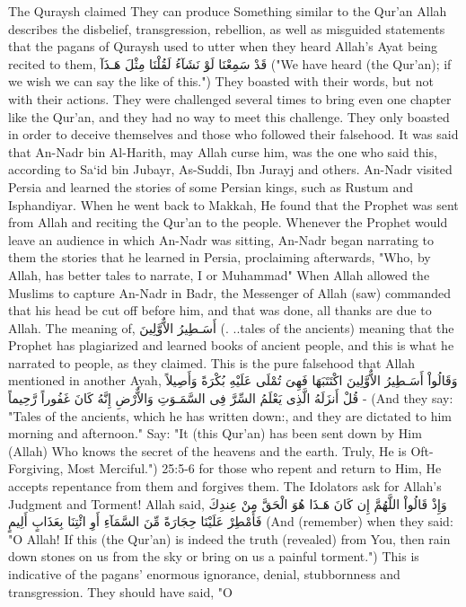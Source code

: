 \documentclass[11pt,a4paper,openany]{book}
\let\textAR\textarabic
\begin{document}
\begin{tafsirbox}
The Quraysh claimed They can produce Something similar to the Qur'an Allah describes the disbelief, transgression, rebellion, as well as misguided statements that the pagans of Quraysh used to utter when they heard Allah's Ayat being recited to them, \textAR{قَدْ} \textAR{سَمِعْنَا} \textAR{لَوْ} \textAR{نَشَآءُ} \textAR{لَقُلْنَا} \textAR{مِثْلَ} \textAR{هَـذَآ} ("We have heard (the Qur'an); if we wish we can say the like of this.") They boasted with their words, but not with their actions. They were challenged several times to bring even one chapter like the Qur'an, and they had no way to meet this challenge. They only boasted in order to deceive themselves and those who followed their falsehood. It was said that An-Nadr bin Al-Harith, may Allah curse him, was the one who said this, according to Sa`id bin Jubayr, As-Suddi, Ibn Jurayj and others. An-Nadr visited Persia and learned the stories of some Persian kings, such as Rustum and Isphandiyar. When he went back to Makkah, He found that the Prophet was sent from Allah and reciting the Qur'an to the people. Whenever the Prophet would leave an audience in which An-Nadr was sitting, An-Nadr began narrating to them the stories that he learned in Persia, proclaiming afterwards, "Who, by Allah, has better tales to narrate, I or Muhammad" When Allah allowed the Muslims to capture An-Nadr in Badr, the Messenger of Allah (saw) commanded that his head be cut off before him, and that was done, all thanks are due to Allah. The meaning of, \textAR{أَسَـطِيرُ} \textAR{الاٌّوَّلِينَ} (. ..tales of the ancients) meaning that the Prophet has plagiarized and learned books of ancient people, and this is what he narrated to people, as they claimed. This is the pure falsehood that Allah mentioned in another Ayah, \textAR{وَقَالُواْ} \textAR{أَسَـطِيرُ} \textAR{الاٌّوَّلِينَ} \textAR{اكْتَتَبَهَا} \textAR{فَهِىَ} \textAR{تُمْلَى} \textAR{عَلَيْهِ} \textAR{بُكْرَةً} \textAR{وَأَصِيلاً} - \textAR{قُلْ} \textAR{أَنزَلَهُ} \textAR{الَّذِى} \textAR{يَعْلَمُ} \textAR{السِّرَّ} \textAR{فِى} \textAR{السَّمَـوَتِ} \textAR{وَالاٌّرْضِ} \textAR{إِنَّهُ} \textAR{كَانَ} \textAR{غَفُوراً} \textAR{رَّحِيماً} (And they say: "Tales of the ancients, which he has written down:, and they are dictated to him morning and afternoon." Say: "It (this Qur'an) has been sent down by Him (Allah) Who knows the secret of the heavens and the earth. Truly, He is Oft-Forgiving, Most Merciful.") 25:5-6 for those who repent and return to Him, He accepts repentance from them and forgives them. The Idolators ask for Allah's Judgment and Torment! Allah said, \textAR{وَإِذْ} \textAR{قَالُواْ} \textAR{اللَّهُمَّ} \textAR{إِن} \textAR{كَانَ} \textAR{هَـذَا} \textAR{هُوَ} \textAR{الْحَقَّ} \textAR{مِنْ} \textAR{عِندِكَ} \textAR{فَأَمْطِرْ} \textAR{عَلَيْنَا} \textAR{حِجَارَةً} \textAR{مِّنَ} \textAR{السَّمَآءِ} \textAR{أَوِ} \textAR{ائْتِنَا} \textAR{بِعَذَابٍ} \textAR{أَلِيمٍ} (And (remember) when they said: "O Allah! If this (the Qur'an) is indeed the truth (revealed) from You, then rain down stones on us from the sky or bring on us a painful torment.") This is indicative of the pagans' enormous ignorance, denial, stubbornness and transgression. They should have said, "O 
\end{tafsirbox}
\end{document}
